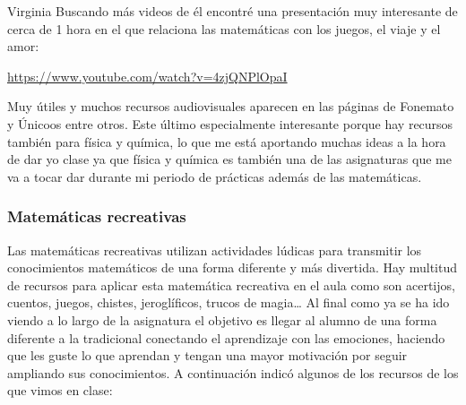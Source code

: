 \begin{opin}{\virgicolor}{Virginia}
Buscando más videos de él encontré una presentación muy interesante de cerca de 1 hora en el que relaciona las matemáticas con los juegos, el viaje y el amor:

\url{https://www.youtube.com/watch?v=4zjQNPlOpaI}

Muy útiles y muchos recursos audiovisuales aparecen en las páginas de Fonemato y Únicoos entre otros. Este último especialmente interesante porque hay recursos también para física y química, lo que me está aportando muchas ideas a la hora de dar yo clase ya que física y química es también una de las asignaturas que me va a tocar dar durante mi periodo de prácticas además de las matemáticas.

\subsubsection{Matemáticas recreativas}

Las matemáticas recreativas utilizan actividades lúdicas para transmitir los conocimientos matemáticos de una forma diferente y más divertida. Hay multitud de recursos para aplicar esta matemática recreativa en el aula como son acertijos, cuentos, juegos, chistes, jeroglíficos, trucos de magia… Al final como ya se ha ido viendo a lo largo de la asignatura el objetivo es llegar al alumno de una forma diferente a la tradicional conectando el aprendizaje con las emociones, haciendo que les guste lo que aprendan y tengan una mayor motivación por seguir ampliando sus conocimientos.
A continuación indicó algunos de los recursos de los que vimos en clase:

\begin{itemize}


\end{itemize}
\end{opin}
